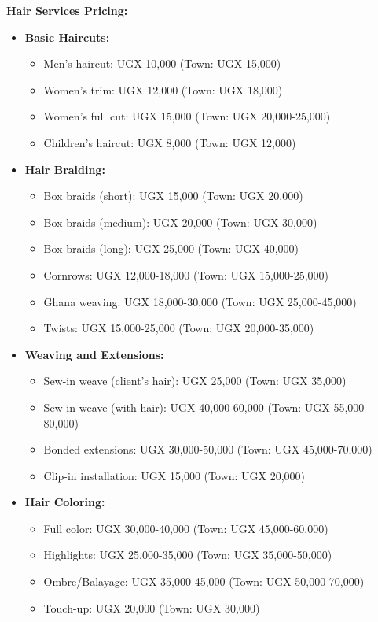 \textbf{Hair Services Pricing:}
\begin{itemize}[leftmargin=2em]
    \item \textbf{Basic Haircuts:}
    \begin{itemize}
        \item Men's haircut: UGX 10,000 (Town: UGX 15,000)
        \item Women's trim: UGX 12,000 (Town: UGX 18,000)
        \item Women's full cut: UGX 15,000 (Town: UGX 20,000-25,000)
        \item Children's haircut: UGX 8,000 (Town: UGX 12,000)
    \end{itemize}
    
    \item \textbf{Hair Braiding:}
    \begin{itemize}
        \item Box braids (short): UGX 15,000 (Town: UGX 20,000)
        \item Box braids (medium): UGX 20,000 (Town: UGX 30,000)
        \item Box braids (long): UGX 25,000 (Town: UGX 40,000)
        \item Cornrows: UGX 12,000-18,000 (Town: UGX 15,000-25,000)
        \item Ghana weaving: UGX 18,000-30,000 (Town: UGX 25,000-45,000)
        \item Twists: UGX 15,000-25,000 (Town: UGX 20,000-35,000)
    \end{itemize}
    
    \item \textbf{Weaving and Extensions:}
    \begin{itemize}
        \item Sew-in weave (client's hair): UGX 25,000 (Town: UGX 35,000)
        \item Sew-in weave (with hair): UGX 40,000-60,000 (Town: UGX 55,000-80,000)
        \item Bonded extensions: UGX 30,000-50,000 (Town: UGX 45,000-70,000)
        \item Clip-in installation: UGX 15,000 (Town: UGX 20,000)
    \end{itemize}
    
    \item \textbf{Hair Coloring:}
    \begin{itemize}
        \item Full color: UGX 30,000-40,000 (Town: UGX 45,000-60,000)
        \item Highlights: UGX 25,000-35,000 (Town: UGX 35,000-50,000)
        \item Ombre/Balayage: UGX 35,000-45,000 (Town: UGX 50,000-70,000)
        \item Touch-up: UGX 20,000 (Town: UGX 30,000)
    \end{itemize}
    

\end{itemize}
